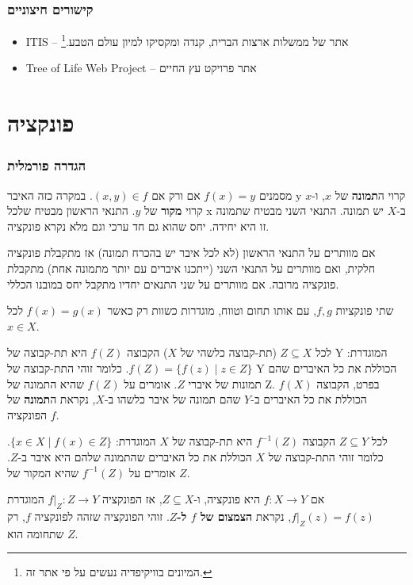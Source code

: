 \documentclass{article}
\begin{document}
\section{קישורים חיצוניים}

\begin{itemize}
  \item ITIS – אתר של ממשלות ארצות הברית, קנדה ומקסיקו למיון עולם
  הטבע.\footnote{המיונים בוויקיפדיה נעשים על פי אתר זה.}
  \item Tree of Life Web Project – אתר פרויקט עץ החיים
\end{itemize}


\part{פונקציה}

\section{הגדרה פורמלית}

מסמנים $f(x)=y$ אם ורק אם $(x,y) \in f$. במקרה כזה האיבר y קרוי
ה\textbf{תמונה} של $x$, ו-$x$ קרוי \textbf{מקור} של $y$. התנאי הראשון
מבטיח שלכל x ב-$X$ יש תמונה. התנאי השני מבטיח שתמונה זו היא יחידה. יחס
שהוא גם חד ערכי וגם מלא נקרא פונקציה.

אם מוותרים על התנאי הראשון (לא לכל איבר יש בהכרח תמונה) אז מתקבלת
פונקציה חלקית, ואם מוותרים על התנאי השני (ייתכנו איברים עם יותר
מתמונה אחת) מתקבלת פונקציה מרובה. אם מוותרים על שני התנאים יחדיו
מתקבל יחס במובנו הכללי.

שתי פונקציות $f,g$, עם אותו תחום וטווח, מוגדרות כשוות רק כאשר
$f(x)=g(x)$ לכל $x\in X$.

לכל $Z \subseteq X$ (תת-קבוצה כלשהי של $X$) הקבוצה $f(Z)$ היא תת-קבוצה
של Y המוגדרת: $f(Z) = \{f(z) \mid z\in Z \}$. כלומר זוהי התת-קבוצה של Y
הכוללת את כל האיברים שהם תמונות של איברי $Z$. אומרים על $f(Z)$ שהיא
התמונה של Z. בפרט, הקבוצה $f(X)$ הכוללת את כל האיברים ב-$Y$ שהם תמונה
של איבר כלשהו ב-$X$, נקראת ה\textbf{תמונה} של הפונקציה $f$.

לכל $Z \subseteq Y$ הקבוצה $f^{-1}(Z)$ היא תת-קבוצה של $X$ המוגדרת: $\{x
\in X \mid f(x)\in Z\}$. כלומר זוהי התת-קבוצה של $X$ הכוללת את כל האיברים
שהתמונה שלהם היא איבר ב-$Z$. אומרים על $f^{-1}(Z)$ שהיא המקור של $Z$.

אם $f: X \to Y$ היא פונקציה, ו-$Z \subseteq X$, אז הפונקציה $f|_Z : Z
\to Y$ המוגדרת $f|_Z(z) = f(z)$, נקראת \textbf{הצמצום של $f$ ל-$Z$}. זוהי
הפונקציה שזהה לפונקציה $f$, רק שתחומה הוא $Z$.
\end{document}
